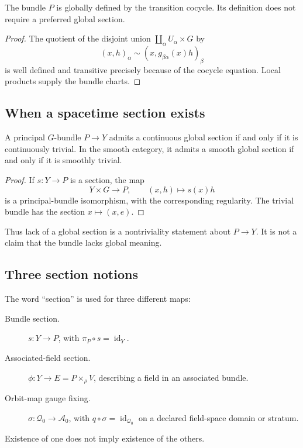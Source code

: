 \documentclass[11pt]{article}
\newcommand{\id}{\operatorname{id}}
\newcommand{\Conn}{\mathcal A}
\newcommand{\Orb}{\mathcal Q}
\begin{document}
\begin{proposition}
\label{prop:no-section-required}
The bundle $P$ is globally defined by the transition cocycle.  Its definition
does not require a preferred global section.
\end{proposition}

\begin{proof}
The quotient of the disjoint union
$\coprod_\alpha U_\alpha\times G$ by
\[
 (x,h)_\alpha\sim(x,g_{\beta\alpha}(x)h)_\beta
\]
is well defined and transitive precisely because of the cocycle equation.
Local products supply the bundle charts.
\end{proof}

\subsection{When a spacetime section exists}

\begin{theorem}
\label{thm:bundle-section}
A principal $G$-bundle $P\to Y$ admits a continuous global section if and only
if it is continuously trivial.  In the smooth category, it admits a smooth
global section if and only if it is smoothly trivial.
\end{theorem}

\begin{proof}
If $s:Y\to P$ is a section, the map
\[
 Y\times G\longrightarrow P,\qquad (x,h)\longmapsto s(x)h
\]
is a principal-bundle isomorphism, with the corresponding regularity.
The trivial bundle has the section $x\mapsto(x,e)$.
\end{proof}

Thus lack of a global section is a nontriviality statement about $P\to Y$.
It is not a claim that the bundle lacks global meaning.

\subsection{Three section notions}

The word ``section'' is used for three different maps:
\begin{description}
\item[Bundle section.]
$s:Y\to P$, with $\pi_P\circ s=\id_Y$.

\item[Associated-field section.]
$\phi:Y\to E=P\times_\rho V$, describing a field in an associated bundle.

\item[Orbit-map gauge fixing.]
$\sigma:\Orb_0\to\Conn_0$, with
$q\circ\sigma=\id_{\Orb_0}$ on a declared field-space domain or stratum.
\end{description}
Existence of one does not imply existence of the others.
\end{document}
